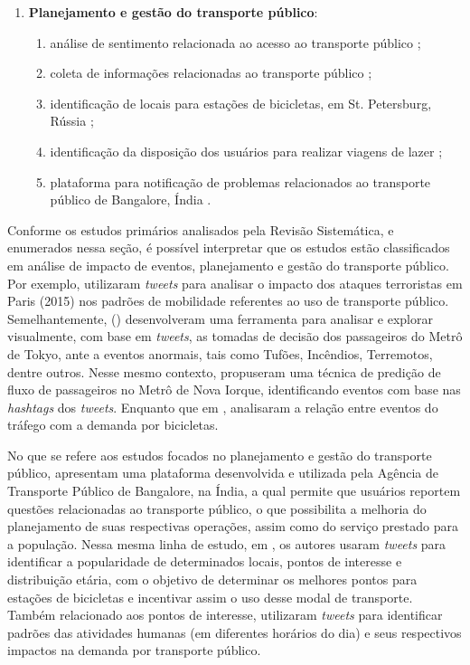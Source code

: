 \documentclass[
	12pt,				%
	oneside,			%
	a4paper,			%
	english,			%
	brazil				%
	]{abntex2ppgsi}
\begin{document}
{{{\begin{enumerate}
\item \textbf{Planejamento e gestão do transporte público}:
\begin{enumerate}
\item análise de sentimento relacionada ao acesso ao transporte público \cite{Guo2016};
\item coleta de informações relacionadas ao transporte público \cite{Gal-Tzur2014};
\item identificação de locais para estações de bicicletas, em St. Petersburg, Rússia \cite{Gutev2016};
\item identificação da disposição dos usuários para realizar viagens de lazer \cite{Gkiotsalitis2016};
\item plataforma para notificação de problemas relacionados ao transporte público de Bangalore, Índia \cite{Mukherjee2015}.
\end{enumerate} 
\end{enumerate}

Conforme os estudos primários analisados pela Revisão Sistemática, e enumerados nessa seção, é possível interpretar que os estudos estão classificados em análise de impacto de eventos, planejamento e gestão do transporte público. Por exemplo, \cite{Wen2016} utilizaram \textit{tweets} para analisar o impacto dos ataques terroristas em Paris (2015) nos padrões de mobilidade referentes ao uso de transporte público. Semelhantemente, \citeauthor{Itoh2016} (\citeyear{Itoh2016}) desenvolveram uma ferramenta para analisar e explorar visualmente, com base em \textit{tweets}, as tomadas de decisão dos passageiros do Metrô de Tokyo, ante a eventos anormais, tais como Tufões, Incêndios, Terremotos, dentre outros. Nesse mesmo contexto, \cite{Ni2016} propuseram uma técnica de predição de fluxo de passageiros no Metrô de Nova Iorque, identificando eventos com base nas \textit{hashtags} dos \textit{tweets}. Enquanto que em \cite{Chen2016}, analisaram a relação entre eventos do tráfego com a demanda por bicicletas.

No que se refere aos estudos focados no planejamento e gestão do transporte público, \cite{Mukherjee2015} apresentam uma plataforma desenvolvida e utilizada pela Agência de Transporte Público de Bangalore, na Índia, a qual permite que usuários reportem questões relacionadas ao transporte  público, o que possibilita a melhoria do planejamento de suas respectivas operações, assim como do serviço prestado para a população. Nessa mesma linha de estudo, em \cite{Gutev2016}, os autores usaram \textit{tweets} para identificar a popularidade de determinados locais, pontos de interesse e distribuição etária, com o objetivo de determinar os melhores pontos para estações de bicicletas e incentivar assim o uso desse modal de transporte. Também relacionado aos pontos de interesse, \cite{Maghrebi2015} utilizaram \textit{tweets} para identificar padrões das atividades humanas (em diferentes horários do dia) e seus respectivos impactos na demanda por transporte público.

}}}
\end{document}

